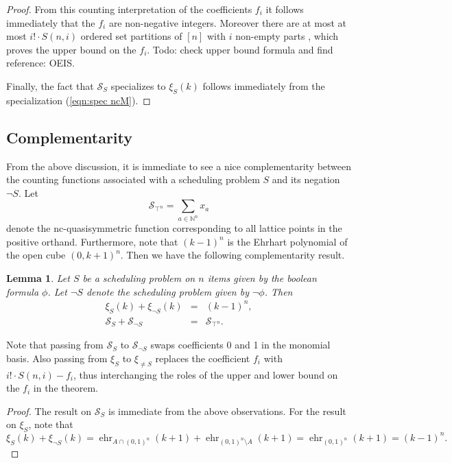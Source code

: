 \documentclass[12pt,reqno]{amsart}
\numberwithin{definition}{section}
\newtheorem{lemma}[definition]{Lemma}
\theoremstyle{definition}
\newcommand{\NN}{\mathbb{N}}
\newcommand{\SSS}{\mathcal{S}}
\newcommand{\ehr}{\operatorname{ehr}}
\newcommand{\comment}[1]{\textsf{\footnotesize #1}}
\begin{document}
\begin{proof}
From this counting interpretation of the coefficients $f_i$ it follows immediately that the $f_i$ are non-negative integers. Moreover there are at most at most $i!\cdot S(n,i)$ ordered set partitions of $[n]$ with $i$ non-empty parts \cite{something}, which proves the upper bound on the $f_i$. \comment{Todo: check upper bound formula and find reference: OEIS.}

Finally, the fact that $\SSS_S$ specializes to $\xi_S(k)$ follows immediately from the specialization (\ref{eqn:spec ncM}).
\end{proof}

\subsection{Complementarity}

From the above discussion, it is immediate to see a nice complementarity between the counting functions associated with a scheduling problem $S$ and its negation $\neg S$. Let 
\[
  \SSS_{\top^n} = \sum_{a\in\NN^n} x_a
\]
denote the nc-quasisymmetric function corresponding to all lattice points in the positive orthand. Furthermore, note that $(k-1)^n$ is the Ehrhart polynomial of the open cube $(0,k+1)^n$. Then we have the following complementarity result.

\begin{lemma}
Let $S$ be a scheduling problem on $n$ items given by the boolean formula $\phi$. Let $\neg S$ denote the scheduling problem given by $\neg\phi$. Then 
\begin{eqnarray*}
  \xi_{S}(k) + \xi_{\neg S}(k) &=& (k-1)^n, \\
  \SSS_S + \SSS_{\neg S} &=& \SSS_{\top^n}.
\end{eqnarray*}
\end{lemma}

Note that passing from $\SSS_S$ to $\SSS_{\neg S}$ swaps coefficients 0 and 1 in the monomial basis. Also passing from $\xi_S$ to $\xi_{\neq S}$ replaces the coefficient $f_i$ with $i!\cdot S(n,i) - f_i$, thus interchanging the roles of the upper and lower bound on the $f_i$ in the theorem.

\begin{proof}
The result on $\SSS_S$ is immediate from the above observations. For the result on $\xi_S$, note that 
\[
 \xi_{S}(k) + \xi_{\neg S}(k) = \ehr_{A\cap(0,1)^n}(k+1) +  \ehr_{(0,1)^n\setminus A}(k+1) = \ehr_{(0,1)^n}(k+1) = (k-1)^n.
\]
\end{proof}
\end{document}

